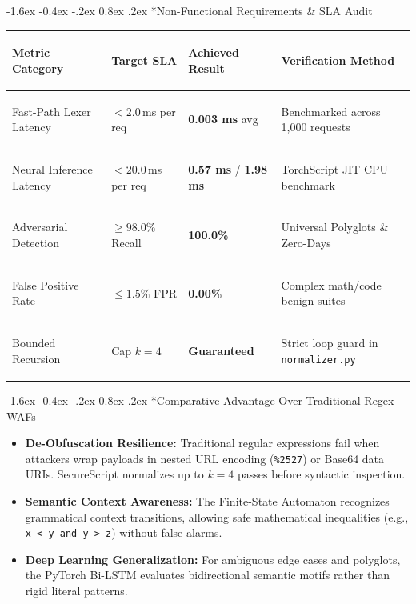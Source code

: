\documentclass[11pt,a4paper]{article}
\makeatletter
\renewcommand{\section}{\@startsection{section}{1}{\z@}%
  {-1.6ex \@plus -0.4ex \@minus -.2ex}%
  {0.8ex \@plus .2ex}%
  {\normalfont\large\bfseries\color{primaryblue}}}
\makeatother
\begin{document}
\section*{Non-Functional Requirements & SLA Audit}
\begin{table}[htbp]
\centering
\footnotesize
\begin{tabularx}{\textwidth}{>{\bfseries\raggedright\arraybackslash}p{3.2cm} >{\centering\arraybackslash}p{2.8cm} >{\centering\arraybackslash}p{2.8cm} >{\raggedright\arraybackslash}X}
\toprule
\textbf{Metric Category} & \textbf{Target SLA} & \textbf{Achieved Result} & \textbf{Verification Method} \\
\midrule
Fast-Path Lexer Latency & $< 2.0$\,ms per req & \textbf{0.003 ms} avg & Benchmarked across 1,000 requests \\
Neural Inference Latency & $< 20.0$\,ms per req & \textbf{0.57 ms} / \textbf{1.98 ms} & TorchScript JIT CPU benchmark \\
Adversarial Detection & $\ge 98.0\%$ Recall & \textbf{100.0\%} & 31 Universal Polyglots \& Zero-Days \\
False Positive Rate & $\le 1.5\%$ FPR & \textbf{0.00\%} & 17 Complex math/code benign suites \\
Bounded Recursion & Cap $k = 4$ & \textbf{Guaranteed} & Strict loop guard in \texttt{normalizer.py} \\
\bottomrule
\end{tabularx}
\end{table}

\section*{Comparative Advantage Over Traditional Regex WAFs}
\begin{itemize}[leftmargin=1.5em, itemsep=2pt]
    \item \textbf{De-Obfuscation Resilience:} Traditional regular expressions fail when attackers wrap payloads in nested URL encoding (\texttt{\%2527}) or Base64 data URIs. SecureScript normalizes up to $k=4$ passes before syntactic inspection.
    \item \textbf{Semantic Context Awareness:} The Finite-State Automaton recognizes grammatical context transitions, allowing safe mathematical inequalities (e.g., \texttt{x < y and y > z}) without false alarms.
    \item \textbf{Deep Learning Generalization:} For ambiguous edge cases and polyglots, the PyTorch Bi-LSTM evaluates bidirectional semantic motifs rather than rigid literal patterns.
\end{itemize}
\end{document}
